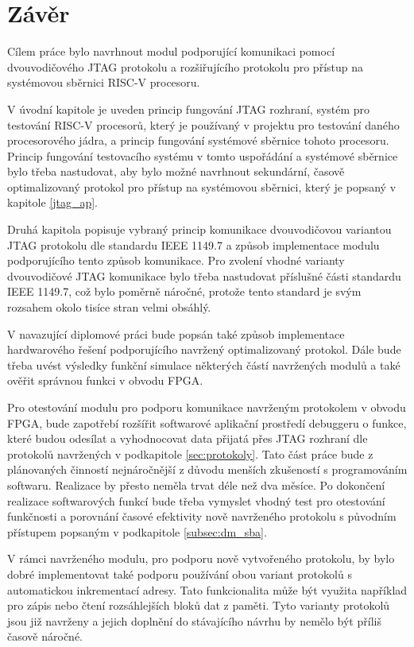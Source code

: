 \chapter*{Závěr}
{}

Cílem práce bylo navrhnout modul podporující komunikaci pomocí dvouvodičového \acs{JTAG} protokolu a rozšiřujícího protokolu pro přístup na systémovou sběrnici \acs{RISC-V} procesoru.

V úvodní kapitole je uveden princip fungování \acs{JTAG} rozhraní, systém pro testování \acs{RISC-V} procesorů, který je používaný v projektu pro testování daného procesorového jádra, a princip fungování systémové sběrnice tohoto procesoru. Princip fungování testovacího systému v tomto uspořádání a systémové sběrnice bylo třeba nastudovat, aby bylo možné navrhnout sekundární, časově optimalizovaný protokol pro přístup na systémovou sběrnici, který je popsaný v kapitole \ref{jtag_ap}.

Druhá kapitola popisuje vybraný princip komunikace dvouvodičovou variantou \acs{JTAG} protokolu dle standardu IEEE 1149.7 a způsob implementace modulu podporujícího tento způsob komunikace. Pro zvolení vhodné varianty dvouvodičové \acs{JTAG} komunikace bylo třeba nastudovat příslušné části standardu IEEE 1149.7, což bylo poměrně náročné, protože tento standard je svým rozsahem okolo tisíce stran velmi obsáhlý. 

V navazující diplomové práci bude popsán také způsob implementace hardwarového řešení podporujícího navržený optimalizovaný protokol. Dále bude třeba uvést výsledky funkční simulace některých částí navržených modulů a také ověřit správnou funkci v obvodu \acs{FPGA}.

Pro otestování modulu pro podporu komunikace navrženým protokolem v obvodu \acs{FPGA}, bude zapotřebí rozšířit softwarové aplikační prostředí debuggeru o funkce, které budou odesílat a vyhodnocovat data přijatá přes \acs{JTAG} rozhraní dle protokolů navržených v podkapitole \ref{sec:protokoly}. Tato část práce bude z plánovaných činností nejnáročnější z důvodu menších zkušeností s programováním softwaru. Realizace by přesto neměla trvat déle než dva měsíce. Po dokončení realizace softwarových funkcí bude třeba vymyslet vhodný test pro otestování funkčnosti a porovnání časové efektivity nově navrženého protokolu s původním přístupem popsaným v podkapitole \ref{subsec:dm_sba}.

V rámci navrženého modulu, pro podporu nově vytvořeného protokolu, by bylo dobré implementovat také podporu používání obou variant protokolů s automatickou inkrementací adresy. Tato funkcionalita může být využita například pro zápis nebo čtení rozsáhlejších bloků dat z paměti. Tyto varianty protokolů jsou již navrženy a jejich doplnění do stávajícího návrhu by nemělo být příliš časově náročné.